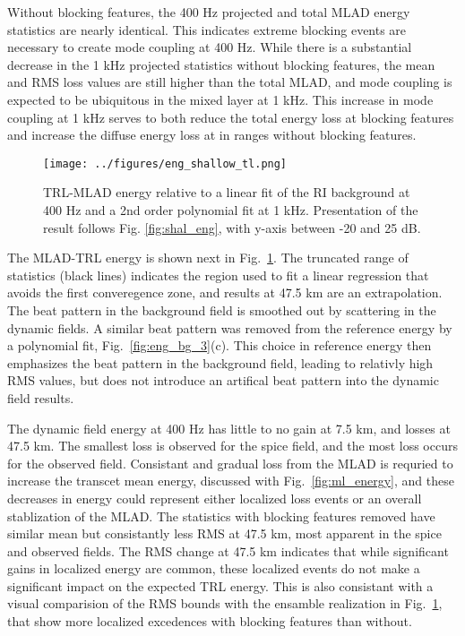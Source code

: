 \documentclass[preprint,NumberedRefs]{JASA}
\begin{document}
Without blocking features, the 400 Hz projected and total MLAD energy statistics are nearly identical. This indicates extreme blocking events are necessary to create mode coupling at 400 Hz. While there is a substantial decrease in the 1 kHz projected statistics without blocking features, the mean and RMS loss values are still higher than the total MLAD, and mode coupling is expected to be ubiquitous in the mixed layer at 1 kHz. This increase in mode coupling at 1 kHz serves to both reduce the total energy loss at blocking features and increase the diffuse energy loss at in ranges without blocking features.

\begin{figure}
\texttt{[image: ../figures/eng\_shallow\_tl.png]}
        \caption{TRL-MLAD energy relative to a linear fit of the RI background at 400 Hz and a 2nd order polynomial fit at 1 kHz. Presentation of the result follows Fig. \ref{fig:shal_eng}, with y-axis between -20 and 25 dB.}
    \label{fig:eng_tl}
\end{figure}
The MLAD-TRL energy is shown next in Fig.~\ref{fig:eng_tl}. The truncated range of statistics (black lines) indicates the region used to fit a linear regression that avoids the first converegence zone, and results at 47.5 km are an extrapolation. The beat pattern in the background field is smoothed out by scattering in the dynamic fields. A similar beat pattern was removed from the reference energy by a polynomial fit, Fig.~\ref{fig:eng_bg_3}(c). This choice in reference energy then emphasizes the beat pattern in the background field, leading to relativly high RMS values, but does not introduce an artifical beat pattern into the dynamic field results.

The dynamic field energy at 400 Hz has little to no gain at 7.5 km, and losses at 47.5 km. The smallest loss is observed for the spice field, and the most loss occurs for the observed field. Consistant and gradual loss from the MLAD is requried to increase the transcet mean energy, discussed with Fig.~\ref{fig:ml_energy}, and these decreases in energy could represent either localized loss events or an overall stablization of the MLAD. The statistics with blocking features removed have similar mean but consistantly less RMS at 47.5 km, most apparent in the spice and observed fields. The RMS change at 47.5 km indicates that while significant gains in localized energy are common, these localized events do not make a significant impact on the expected TRL energy. This is also consistant with a visual comparision of the RMS bounds with the ensamble realization in Fig.~\ref{fig:eng_tl}, that show more localized excedences with blocking features than without.
\end{document}
